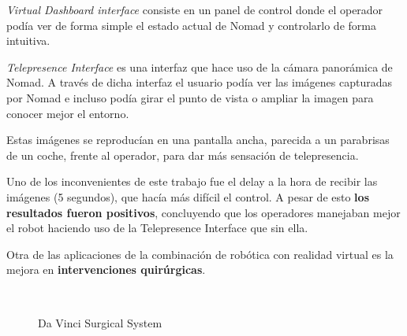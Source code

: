 \documentclass[twoside, 11pt]{epstfg}
\begin{document}
\textit{Virtual Dashboard interface} consiste en un panel de control donde el operador podía ver de forma simple el estado actual de Nomad y controlarlo de forma intuitiva.

\textit{Telepresence Interface} es una interfaz que hace uso de la cámara panorámica de Nomad. A través de dicha interfaz el usuario podía ver las imágenes capturadas por Nomad e incluso podía girar el punto de vista o ampliar la imagen para conocer mejor el entorno.

Estas imágenes se reproducían en una pantalla ancha, parecida a un parabrisas de un coche, frente al operador, para dar más sensación de telepresencia.

Uno de los inconvenientes de este trabajo fue el delay a la hora de recibir las imágenes (5 segundos), que hacía más difícil el control.
A pesar de esto \textbf{los resultados fueron positivos}, concluyendo que los operadores manejaban mejor el robot haciendo uso de la Telepresence Interface que sin ella.


Otra de las aplicaciones de la combinación de robótica con realidad virtual es la mejora en \textbf{intervenciones quirúrgicas}.
\begin{figure}[h]
	\centering
	\\
	\caption{Da Vinci Surgical System} \label{daVinci}
\end{figure}
\end{document}
